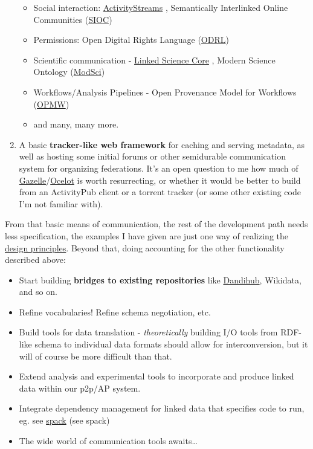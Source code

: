 \documentclass[10pt]{article}
\begin{document}
\begin{multicols}{2}
\begin{enumerate}
\begin{itemize}
  \item
    Social interaction:
    \href{https://www.w3.org/TR/activitystreams-vocabulary/}{ActivityStreams}
    \cite{snellActivityStreams2017} , Semantically Interlinked
    Online Communities (\href{http://sioc-project.org/}{SIOC}) \cite{harthLinkingSemanticallyEnabled2004} 
  \item
    Permissions: Open Digital Rights Language
    (\href{https://www.w3.org/ns/odrl/2/}{ODRL})
  \item
    Scientific communication -
    \href{http://linkedscience.org/lsc/ns/}{Linked Science Core} \cite{kauppinenLinkedOpenScienceCommunicating2011} , Modern
    Science Ontology
    (\href{https://saidfathalla.github.io/Science-knowledge-graph-ontologies/doc/ModSci_doc/index-en.html\#dataproperties-headline}{ModSci})
  \item
    Workflows/Analysis Pipelines - Open Provenance Model for Workflows
    (\href{https://www.opmw.org/model/OPMW/}{OPMW})
  \item
    and many, many more.
  \end{itemize}
\item
  A basic \textbf{tracker-like web framework} for caching and serving
  metadata, as well as hosting some initial forums or other semidurable
  communication system for organizing federations. It's an open question
  to me how much of
  \href{https://github.com/WhatCD/Gazelle}{Gazelle}/\href{https://github.com/WhatCD/Ocelot}{Ocelot}
  is worth resurrecting, or whether it would be better to build from an
  ActivityPub client or a torrent tracker (or some other existing code
  I'm not familiar with).
\end{enumerate}

From that basic means of communication, the rest of the development path
needs less specification, the examples I have given are just one way of
realizing the \protect\hyperlink{design-principles}{design principles}.
Beyond that, doing accounting for the other functionality described
above:

\begin{itemize}

\item
  Start building \textbf{bridges to existing repositories} like
  \href{https://gui.dandiarchive.org/\#/}{Dandihub}, Wikidata, and so
  on.
\item
  Refine vocabularies! Refine schema negotiation, etc.
\item
  Build tools for data translation - \emph{theoretically} building I/O
  tools from RDF-like schema to individual data formats should allow for
  interconversion, but it will of course be more difficult than that.
\item
  Extend analysis and experimental tools to incorporate and produce
  linked data within our p2p/AP system.
\item
  Integrate dependency management for linked data that specifies code to
  run, eg. see \href{https://spack.readthedocs.io/en/latest/\#}{spack}
  (see spack)
\item
  The wide world of communication tools awaits\ldots{}
\end{itemize}


\end{multicols}
\end{document}
